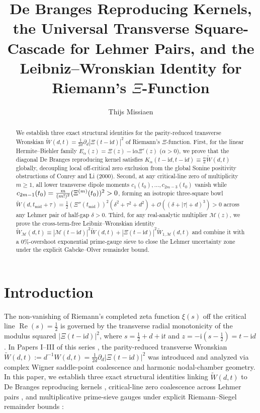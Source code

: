 \documentclass[11pt,reqno,a4paper]{amsart}
\title[De Branges Kernels, Lehmer Cascade, and Leibniz--Wronskian Identity]{De Branges Reproducing Kernels, the Universal Transverse Square-Cascade for Lehmer Pairs, and the Leibniz--Wronskian Identity for Riemann's $\Xi$-Function}
\author{Thijs Missiaen}
\theoremstyle{plain}
\theoremstyle{definition}
\theoremstyle{remark}
\numberwithin{equation}{section}
\newcommand{\fac}{\mathclose{\mathchar"0021}}
\newcommand{\ii}{\mathrm{i}}
\begin{document}
\begin{abstract}
We establish three exact structural identities for the parity-reduced transverse Wronskian $\widetilde{W}(d,t) = \frac{1}{2d}\partial_d|\Xi(t-\ii d)|^2$ of Riemann's $\Xi$-function. First, for the linear Hermite--Biehler family $E_\alpha(z) = \Xi(z) - \ii\alpha\Xi'(z)$ ($\alpha > 0$), we prove that the diagonal De Branges reproducing kernel satisfies $K_\alpha(t-\ii d, t-\ii d) \equiv \frac{\alpha}{\pi}\widetilde{W}(d,t)$ globally, decoupling local off-critical zero exclusion from the global Sonine positivity obstructions of Conrey and Li (2000). Second, at any critical-line zero of multiplicity $m \ge 1$, all lower transverse dipole moments $c_1(t_0),\dots,c_{2m-3}(t_0)$ vanish while $c_{2m-1}(t_0) = \frac{m}{(m\fac)^2}(\Xi^{(m)}(t_0))^2 > 0$, forming an isotropic three-square bowl $\widetilde{W}(d,t_{\mathrm{mid}}+\tau) = \frac{1}{2}(\Xi''(t_{\mathrm{mid}}))^2(\delta^2 + \tau^2 + d^2) + \mathcal{O}((\delta+|\tau|+d)^3) > 0$ across any Lehmer pair of half-gap $\delta > 0$. Third, for any real-analytic multiplier $\mathcal{M}(z)$, we prove the cross-term-free Leibniz--Wronskian identity $\widetilde{W}_{\mathcal{M}}(d,t) \equiv |\mathcal{M}(t-\ii d)|^2\widetilde{W}(d,t) + |\Xi(t-\ii d)|^2\widetilde{W}_{1,\mathcal{M}}(d,t)$ and combine it with a $0\%$-overshoot exponential prime-gauge sieve to close the Lehmer uncertainty zone under the explicit Gabcke--Olver remainder bound.
\end{abstract}

\maketitle

\section{Introduction}\label{sec:introduction}

The non-vanishing of Riemann's completed zeta function $\xi(s)$ off the critical line $\operatorname{Re}(s) = \frac{1}{2}$ is governed by the transverse radial monotonicity of the modulus squared $|\Xi(t - \ii d)|^2$, where $s = \frac{1}{2} + d + \ii t$ and $z = -\ii(s - \frac{1}{2}) = t - \ii d$. In Papers I--III of this series \cite{MissiaenPaper1,MissiaenPaper2,MissiaenPaper3}, the parity-reduced transverse Wronskian $\widetilde{W}(d,t) := d^{-1}W(d,t) = \frac{1}{2d}\partial_d|\Xi(t-\ii d)|^2$ was introduced and analyzed via complex Wigner saddle-point coalescence and harmonic nodal-chamber geometry. In this paper, we establish three exact structural identities linking $\widetilde{W}(d,t)$ to De Branges reproducing kernels \cite{deBranges1968,deBranges1986,ConreyLi2000}, critical-line zero coalescence across Lehmer pairs \cite{Turan1950,Lehmer1956,CsordasNorfolkVarga1986}, and multiplicative prime-sieve gauges under explicit Riemann--Siegel remainder bounds \cite{Gabcke1979,Conrey1989}:
\end{document}
